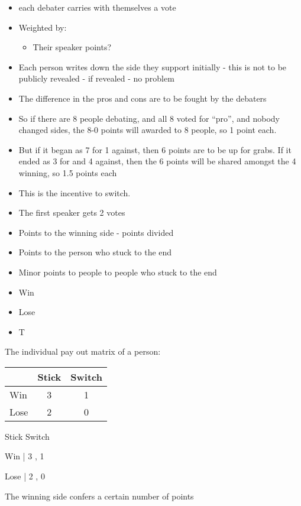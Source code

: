 \begin{itemize}
    \item each debater carries with themselves a vote
    \item Weighted by:
    \begin{itemize}
        \item Their speaker points?
    \end{itemize}
    \item Each person writes down the side they support initially - this is not to be publicly revealed - if revealed - no problem
    \item The difference in the pros and cons are to be fought by the debaters
    \item So if there are 8 people debating, and all 8 voted for ``pro'', and nobody changed sides, the 8-0 points will awarded to 8 people, so 1 point each.
    \item But if it began as 7 for 1 against, then 6 points are to be up for grabs. If it ended as 3 for and 4 against, then the 6 points will be shared amongst the 4 winning, so 1.5 points each
    \item This is the incentive to switch.
    \item The first speaker gets 2 votes
    \item Points to the winning side - points divided
    \item Points to the person who stuck to the end
    \item Minor points to people to people who stuck to the end
    \item Win
    \item Lose
    \item T
\end{itemize}

The individual pay out matrix of a person:

\begin{table}[h]
\centering
\begin{tabular}{l|cc}
\toprule
 & Stick & Switch \\
\midrule
Win & 3 & 1 \\
Lose & 2 & 0 \\
\bottomrule
\end{tabular}
\end{table}

Stick Switch

Win   | 3    , 1

Lose  |  2   , 0

The winning side confers a certain number of points

